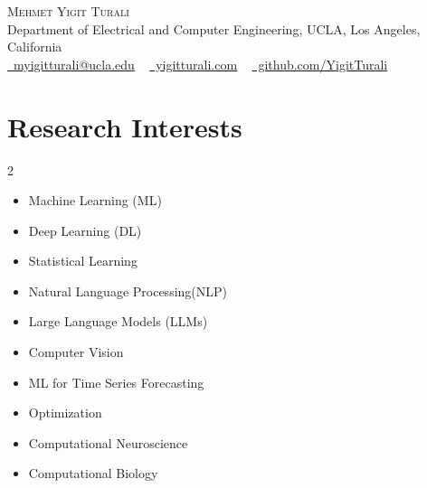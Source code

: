 \documentclass[letterpaper,11pt]{article}
\newcommand{\resumeSubHeadingListStart}{\begin{itemize}[leftmargin=0.0in, label={}]}
\newcommand{\resumeSubHeadingListEnd}{\end{itemize}}
\begin{document}

\begin{center}
    {\Large \scshape Mehmet Yigit Turali} \\ \vspace{1pt}
    Department of Electrical and Computer Engineering, UCLA, Los Angeles, California \\ \vspace{1pt}
    \href{mailto:yigit.turali@ug.bilkent.edu.tr}{\faEnvelope\ myigitturali@ucla.edu} ~ 
    \href{https://www.yigitturali.com/}{\raisebox{-0.05\height}\faGlobeAmericas\ yigitturali.com}  ~
    \href{https://github.com/YigitTurali}{\raisebox{-0.1\height}\faGithub\ github.com/YigitTurali}
    \vspace{-8pt}
\end{center}

\section{Research Interests}
        \begin{multicols}{2}
            \begin{itemize}[itemsep=-5pt, parsep=3pt]
                \item Machine Learning (ML)
                \item Deep Learning (DL)
                \item Statistical Learning
                \item Natural Language Processing(NLP)
                \item Large Language Models (LLMs)
                \item Computer Vision
                \item ML for Time Series Forecasting
                \item Optimization
                \item Computational Neuroscience
                \item Computational Biology
            \end{itemize}
        \end{multicols}
        \vspace*{2.0\multicolsep}
\end{document}
